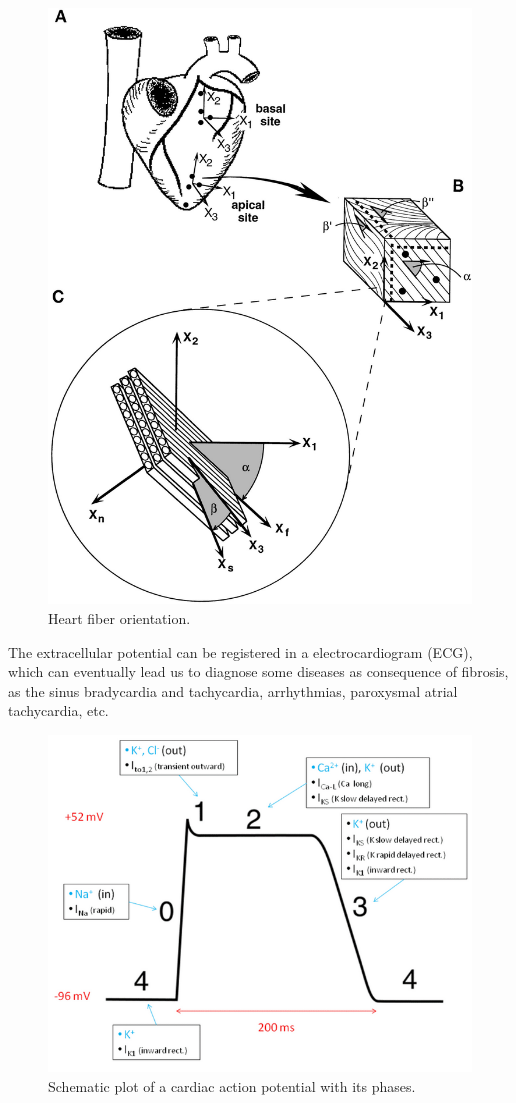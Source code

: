 \begin{figure}[!htbp]
\centering
\includegraphics[scale=.14]{fig/fundamentals-direccionmiocitos}
\caption{Heart fiber orientation.} \label{orientacionmiocitos}
\end{figure}

The extracellular potential can be registered in a electrocardiogram (ECG), which can eventually lead us to diagnose some diseases as consequence of fibrosis, as the sinus bradycardia and tachycardia, arrhythmias, paroxysmal atrial tachycardia, etc.

\begin{figure}[!htbp]
\centering
\includegraphics[height = 7 cm]{fig/fundamentals-action_potential}
\caption{Schematic plot of a cardiac action potential with its phases.} \label{action-potential}
\end{figure}

